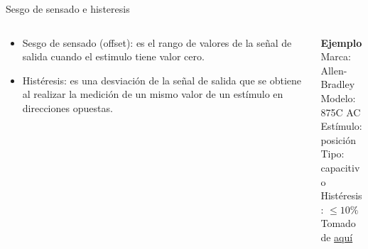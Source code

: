 \documentclass[aspectratio=169]{beamer}
\begin{document}
\begin{frame}{Sesgo de sensado e histeresis}
    \begin{columns}[c, onlytextwidth]
        \begin{column}{0.50\textwidth}
            \begin{itemize}
                \item Sesgo de sensado (offset): es el rango de valores de la señal de salida cuando el estimulo tiene valor cero. 
                \item Histéresis: es una desviación de la señal de salida  que se obtiene al realizar la medición de un mismo valor de un estímulo en direcciones opuestas.
            \end{itemize}
        \end{column}
        \begin{column}{0.45\textwidth}
            \textbf{Ejemplo}\\[4pt]
            Marca: Allen-Bradley\\[4pt]
            Modelo: 875C AC\\[4pt]
            Estímulo: posición\\[4pt]
            Tipo: capacitivo\\[4pt]
            Histéresis: $\leq 10 \%$\\[10pt]
            \tiny{Tomado de \href{https://literature.rockwellautomation.com/idc/groups/literature/documents/td/875c-td001_-en-p.pdf}{aquí}}
        \end{column}
    \end{columns}
\end{frame}
\end{document}

